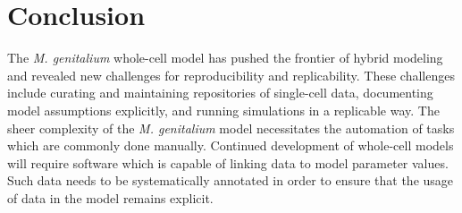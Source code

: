 \documentclass[journal,transmag,twoside]{IEEEtran}
\begin{document}
\section{Conclusion}
%
%
%

The \textit{M. genitalium} whole-cell model has pushed the frontier of hybrid modeling
and revealed new challenges for reproducibility and replicability.
These challenges include curating and maintaining repositories of single-cell data,
documenting model assumptions explicitly, and running simulations in a replicable way.
The sheer complexity of the \textit{M. genitalium} model necessitates the
automation of tasks which are commonly done manually.
Continued development of whole-cell models will require software which is capable
of linking data to model parameter values.
Such data needs to be systematically annotated in order to ensure that
the usage of data in the model remains explicit.
\end{document}
